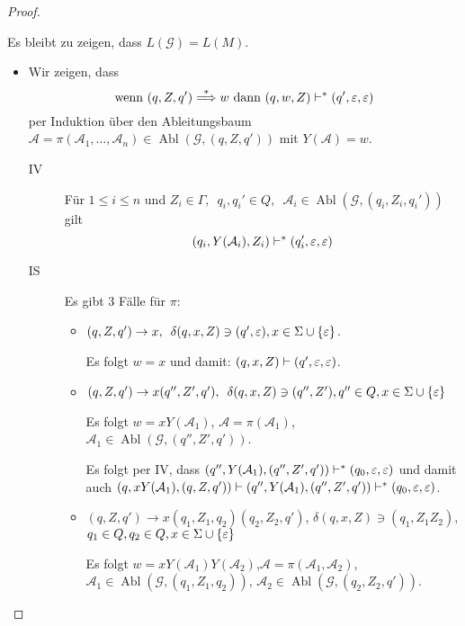 \begin{proof}
\begin{itemize}
    Es bleibt zu zeigen, dass $L(\mathcal{G}) = L(M)$.
    \begin{itemize}
    \item Wir zeigen, dass 
      \begin{displaymath}
        \text{wenn }(q,Z,q')\stackrel{*}{\Longrightarrow} w \text{ dann } (q,w,Z) \vdash^* (q',\varepsilon,\varepsilon)
      \end{displaymath}
      per Induktion über den Ableitungsbaum $\mathcal{A}=\pi(\mathcal{A}_1, \ldots, \mathcal{A}_n) \in \operatorname{Abl}(\mathcal{G}, (q,Z,q'))$ mit $Y(\mathcal{A}) = w$.

      \begin{description}
      \item[IV] Für $1 \le i \le n$ und $Z_i \in \Gamma,\enspace q_i,q_i' \in Q,\enspace \mathcal{A}_i \in \operatorname{Abl}(\mathcal{G}, (q_i, Z_i, q_i'))$ gilt
        \begin{displaymath}
          (q_i,Y(\mathcal{A}_i),Z_i) \vdash^* (q_i',\varepsilon,\varepsilon)
        \end{displaymath}
      \item[IS]
        Es gibt $3$ Fälle für $\pi$:
        \begin{itemize}
        \item $(q, Z, q') \to x,\enspace \delta(q, x, Z) \ni (q', \varepsilon), x \in \Sigma \cup \{\varepsilon\}$.

          Es folgt $w = x$ und damit: $(q, x, Z) \vdash (q', \varepsilon, \varepsilon)$.

        \item $(q, Z, q') \to x(q'', Z', q'), \enspace \delta(q, x, Z) \ni (q'', Z'), q'' \in Q, x \in \Sigma \cup \{\varepsilon\}$

          Es folgt $w = xY(\mathcal{A}_1)$, $\mathcal{A} = \pi(\mathcal{A}_1)$, $\mathcal{A}_1 \in \operatorname{Abl}(\mathcal{G}, (q'', Z', q'))$.

          Es folgt per IV, dass $(q'', Y(\mathcal{A}_1), (q'', Z', q')) \vdash^* (q_0, \varepsilon, \varepsilon)$ und damit auch $(q, xY(\mathcal{A}_1), (q, Z, q')) \vdash (q'', Y(\mathcal{A}_1), (q'', Z', q')) \vdash^* (q_0, \varepsilon, \varepsilon)$.

        \item $(q, Z, q') \to x(q_1,Z_1,q_2)(q_2, Z_2, q')$, $\delta(q, x, Z) \ni (q_1, Z_1Z_2)$, $q_1 \in Q, q_2 \in Q, x \in \Sigma \cup \{\varepsilon\}$ 

          Es folgt $w = xY(\mathcal{A}_1)Y(\mathcal{A}_2)$,\enspace $\mathcal{A} = \pi(\mathcal{A}_1,\mathcal{A}_2)$,\enspace $\mathcal{A}_1 \in \operatorname{Abl}(\mathcal{G}, (q_1, Z_1, q_2))$, $\mathcal{A}_2 \in \operatorname{Abl}(\mathcal{G}, (q_2, Z_2, q'))$.


\end{itemize}
\end{description}
\end{itemize}
\end{itemize}
\end{proof}
